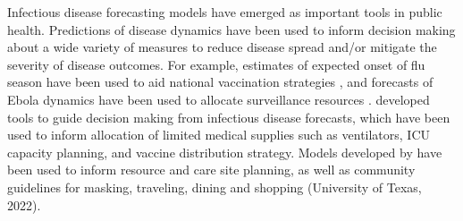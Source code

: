 \documentclass{article}\usepackage[]{graphicx}\usepackage[]{xcolor}
\begin{document}
Infectious disease forecasting models have emerged as important tools in public health. Predictions of disease dynamics have been used to inform decision making about a wide variety of measures to reduce disease spread and/or mitigate the severity of disease outcomes. For example, estimates of expected onset of flu season have been used to aid national vaccination strategies \citep{igboh2023timing}, and forecasts of Ebola dynamics have been used to allocate surveillance resources \citep{meltzer2014estimating, rainisch2015regional}. \cite{bertsimas2021predictionsCOVID} developed tools to guide decision making from infectious disease forecasts, which have been used to inform allocation of limited medical supplies such as ventilators, ICU capacity planning, and vaccine distribution strategy. Models developed by \cite{fox_real-time_2022} have been used to inform resource and care site planning, as well as community guidelines for masking, traveling, dining and shopping (University of Texas, 2022)\nocite{utnews2022}.
\end{document}
